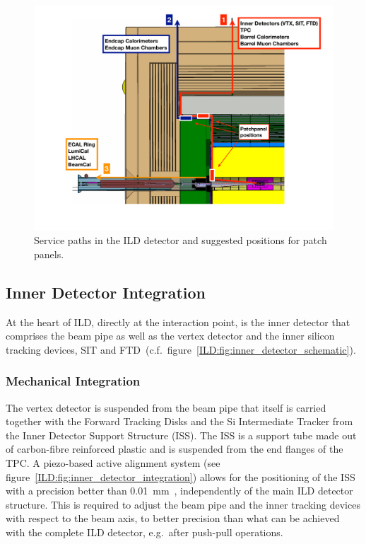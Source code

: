 \begin{figure}[h!]
    \centering
    \includegraphics[width=1.0\hsize]{Integration/fig/cable_paths_new.pdf}
    \caption{Service paths in the ILD detector and suggested positions for patch panels.}
    \label{ILD:fig:cable_paths}
\end{figure}


\subsection{Inner Detector Integration}

At the heart of ILD, directly at the interaction point, is the inner detector that comprises the beam pipe as well as the vertex detector and the inner silicon tracking devices, SIT and FTD~(c.f.~figure~\ref{ILD:fig:inner_detector_schematic}).

\subsubsection{Mechanical Integration}
The vertex detector is suspended from the beam pipe that itself is carried together with the Forward Tracking Disks and the Si Intermediate Tracker from the Inner Detector Support Structure (ISS). The ISS is a support tube made out of carbon-fibre reinforced plastic and is suspended from the end flanges of the TPC. A piezo-based active alignment system (see figure~\ref{ILD:fig:inner_detector_integration}) allows for the positioning of the ISS with a precision better than 0.01~mm~\cite{ild:bib:inner_detector_integration}, independently of the main ILD detector structure. This is required to adjust the beam pipe and the inner tracking devices with respect to the beam axis, to better precision than what can be achieved with the complete ILD detector, e.g.~after push-pull operations.


